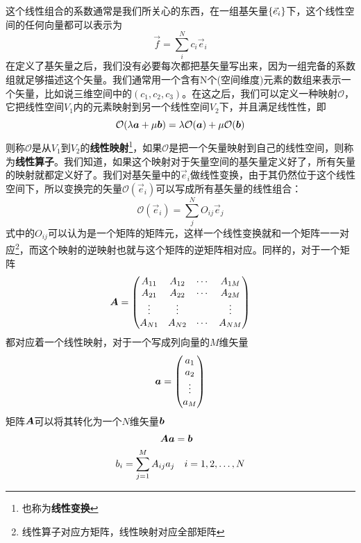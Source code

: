 \documentclass[12pt,a4paper,openany,twoside]{book}
\numberwithin{equation}{section}
\begin{document}
          这个线性组合的系数通常是我们所关心的东西，在一组基矢量$\qty{\vec{e}_i}$下，这个线性空间的任何向量都可以表示为
          \begin{equation}
            \vec{f}=\sum_i^N{c_i\vec{e}_i}
          \end{equation}
          在定义了基矢量之后，我们没有必要每次都把基矢量写出来，因为一组完备的系数组就足够描述这个矢量。我们通常用一个含有N个(空间维度)元素的数组来表示一个矢量，比如说三维空间中的$(c_1,c_2,c_3)$。在这之后，我们可以定义一种映射$\mathcal{O}$，它把线性空间$V_1$内的元素映射到另一个线性空间$V_2$下，并且满足线性性，即
          \begin{equation}
            \mathcal{O}\qty(\lambda\vb*{a}+\mu\vb*{b})=\lambda\mathcal{O}\qty(\vb*{a})+ \mu\mathcal{O}\qty(\vb*{b})
          \end{equation}
          则称$\mathcal{O}$是从$V_1$到$V_2$的\textbf{线性映射}\footnote{也称为\textbf{线性变换}}，如果$\mathcal{O}$是把一个矢量映射到自己的线性空间，则称为\textbf{线性算子}。我们知道，如果这个映射对于矢量空间的基矢量定义好了，所有矢量的映射就都定义好了。我们对基矢量中的$\vec{e}_i$做线性变换，由于其仍然位于这个线性空间下，所以变换完的矢量$\mathcal{O}(\vec{e}_i)$可以写成所有基矢量的线性组合：
          \begin{equation}
            \mathcal{O}(\vec{e}_i)=\sum_j^N{O_{ij}\vec{e}_j}
          \end{equation}
          式中的$O_{ij}$可以认为是一个矩阵的矩阵元，这样一个线性变换就和一个矩阵一一对应\footnote{线性算子对应方矩阵，线性映射对应全部矩阵}，而这个映射的逆映射也就与这个矩阵的逆矩阵相对应。同样的，对于一个矩阵
          \begin{equation}
            \vb*{A}=\mqty(
              A_{11} & A_{12} & \cdots & A_{1 M} \\
              A_{21} & A_{22} & \cdots & A_{2 M} \\
              \vdots & \vdots & {} & \vdots \\
              A_{N 1} & A_{N 2} & \cdots & A_{N M}
            )
          \end{equation}
          都对应着一个线性映射，对于一个写成列向量的$M$维矢量
          \begin{equation}
            \vb*{a}=\mqty(
              a_1 \\
              a_2 \\
              \vdots \\
              a_M
            )
            \label{column vector}
          \end{equation}
          矩阵$\vb*{A}$可以将其转化为一个$N$维矢量$\vb*{b}$
          \begin{equation}
            \begin{aligned}
              \vb*{A} \vb*{a}&=\vb*{b} \\
              b_i=\sum_{j=1}^M{A_{i j} a_j} &\quad i=1,2, \ldots, N
            \end{aligned}
            \label{linear transformation}
          \end{equation}
\end{document}
